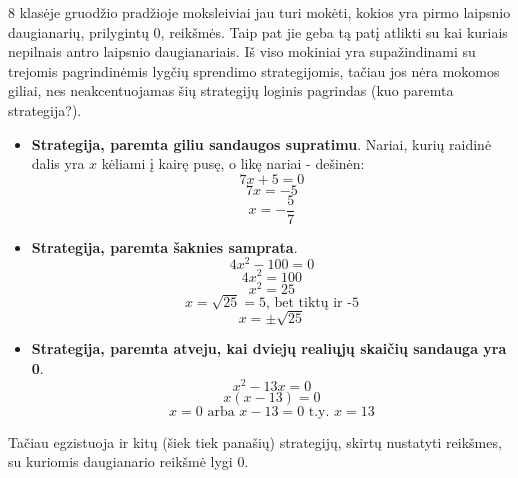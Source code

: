 \documentclass{article}
\begin{document}
8 klasėje gruodžio pradžioje moksleiviai jau turi mokėti, kokios yra pirmo laipsnio daugianarių, prilygintų 0, reikšmės. Taip pat jie geba tą patį atlikti su kai kuriais nepilnais antro laipsnio daugianariais. Iš viso mokiniai yra supažindinami su trejomis pagrindinėmis lygčių sprendimo strategijomis, tačiau jos nėra mokomos giliai, nes neakcentuojamas šių strategijų loginis pagrindas (kuo paremta strategija?).

\begin{itemize}
\item \textbf{Strategija, paremta giliu sandaugos supratimu}. Nariai, kurių raidinė dalis yra $x$ kėliami į kairę pusę, o likę nariai - dešinėn:
$$7x+5=0$$
$$7x=-5$$ 
$$x=-\frac{5}{7}$$
\item \textbf{Strategija, paremta šaknies samprata}. 
$$4x^2-100=0$$
$$4x^2=100$$
$$x^2=25$$
$$x=\sqrt{25}=5\text{, bet tiktų ir -5}$$
$$x=\pm\sqrt{25}$$
\item \textbf{Strategija, paremta atveju, kai dviejų realiųjų skaičių sandauga yra 0}. 
$$x^2-13x=0$$
$$x(x-13)=0$$
$$x=0\text{ arba }x-13=0\text{ t.y. }x=13$$
\end{itemize}
Tačiau egzistuoja ir kitų (šiek tiek panašių) strategijų, skirtų nustatyti reikšmes, su kuriomis daugianario reikšmė lygi 0.
\end{document}
